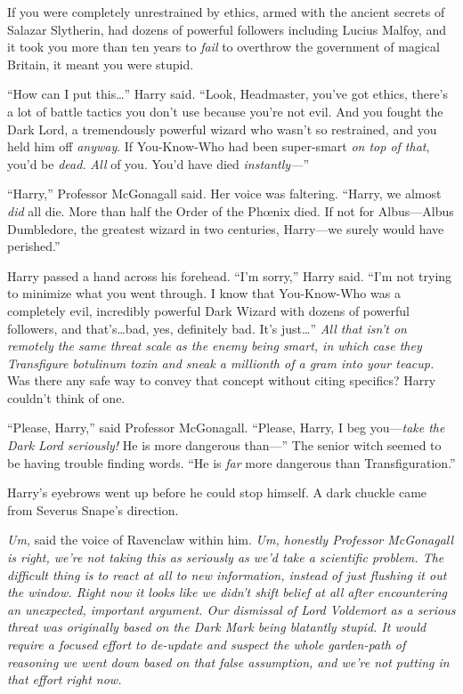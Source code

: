 If you were completely unrestrained by ethics, armed with the ancient secrets of Salazar Slytherin, had dozens of powerful followers including Lucius Malfoy, and it took you more than ten years to \emph{fail} to overthrow the government of magical Britain, it meant you were stupid.

“How can I put this…” Harry said. “Look, Headmaster, you’ve got ethics, there’s a lot of battle tactics you don’t use because you’re not evil. And you fought the Dark Lord, a tremendously powerful wizard who wasn’t so restrained, and you held him off \emph{anyway}. If You-Know-Who had been super-smart \emph{on top of that}, you’d be \emph{dead.} \emph{All} of you. You’d have died \emph{instantly—}”

“Harry,” Professor McGonagall said. Her voice was faltering. “Harry, we almost \emph{did} all die. More than half the Order of the Phœnix died. If not for Albus—Albus Dumbledore, the greatest wizard in two centuries, Harry—we surely would have perished.”

Harry passed a hand across his forehead. “I’m sorry,” Harry said. “I’m not trying to minimize what you went through. I know that You-Know-Who was a completely evil, incredibly powerful Dark Wizard with dozens of powerful followers, and that’s…bad, yes, definitely bad. It’s just…” \emph{All that isn’t on remotely the same threat scale as the enemy being smart, in which case they Transfigure botulinum toxin and sneak a millionth of a gram into your teacup.} Was there any safe way to convey that concept without citing specifics? Harry couldn’t think of one.

“Please, Harry,” said Professor McGonagall. “Please, Harry, I beg you—\emph{take the Dark Lord seriously!} He is more dangerous than—” The senior witch seemed to be having trouble finding words. “He is \emph{far} more dangerous than Transfiguration.”

Harry’s eyebrows went up before he could stop himself. A dark chuckle came from Severus Snape’s direction.

\emph{Um,} said the voice of Ravenclaw within him. \emph{Um, honestly Professor McGonagall is right, we’re not taking this as seriously as we’d take a scientific problem. The difficult thing is to react \emph{at all} to new information, instead of just flushing it out the window. Right now it looks like we didn’t shift belief \emph{at all} after encountering an unexpected, important argument. Our dismissal of Lord Voldemort as a serious threat \emph{was} originally based on the Dark Mark being blatantly stupid. It would require a focused effort to de-update and suspect the whole garden-path of reasoning we went down based on that false assumption, and we’re \emph{not} putting in that effort right now.}

